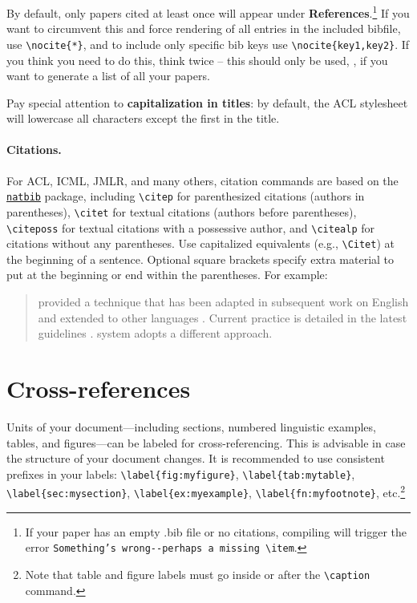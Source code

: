 By default, only papers cited at least once will appear under \textbf{References}.\footnote{\label{fn:emptybib}If your paper has an empty .bib file or no citations, compiling will trigger the error \texttt{Something's wrong-{}-perhaps a missing \textbackslash item}.}
If you want to circumvent this and force rendering of all entries in the
included bibfile, use \verb|\nocite{*}|, and to include only specific bib keys
use \verb|\nocite{key1,key2}|. If you think you need to do this, think twice --
this should only be used, \eg, if you want to generate a list of all your
papers.

Pay special attention to \textbf{capitalization in titles}:
by default, the ACL stylesheet will lowercase all characters except the first in the title.

\paragraph{Citations.}
For ACL, ICML, JMLR, and many others,
citation commands are based on the \href{http://tug.ctan.org/macros/latex/contrib/natbib/natbib.pdf}{\texttt{natbib}} package, including
\verb|\citep| for parenthesized citations (authors in parentheses),
\verb|\citet| for textual citations (authors before parentheses),
\verb|\citeposs| for textual citations with a possessive author, and
\verb|\citealp| for citations without any parentheses.
Use capitalized equivalents (e.g., \verb|\Citet|) at the beginning
of a sentence. Optional square brackets specify extra material to put at the beginning or end within the parentheses.
For example:

\begin{quote}
 provided a technique that has been adapted in subsequent work on English \citep{schneider-18,prange-19} and extended to other languages \citep[e.g.,][]{zhu-19}.
Current practice is detailed in the latest guidelines \citep[pp.~77--78]{snacs}.
 system adopts a different approach.
\end{quote}

\section{Cross-references}\label{sec:xref}

Units of your document---including sections, numbered linguistic examples,
tables, and figures---can be labeled for cross-referencing.
This is advisable in case the structure of your document changes.
It is recommended to use consistent prefixes in your labels:
\verb|\label{fig:myfigure}|, \verb|\label{tab:mytable}|,
\verb|\label{sec:mysection}|, \verb|\label{ex:myexample}|,
\verb|\label{fn:myfootnote}|, etc.\footnote{\label{fn:captions}Note that
table and figure labels must go inside or after the \texttt{\textbackslash caption} command.}

